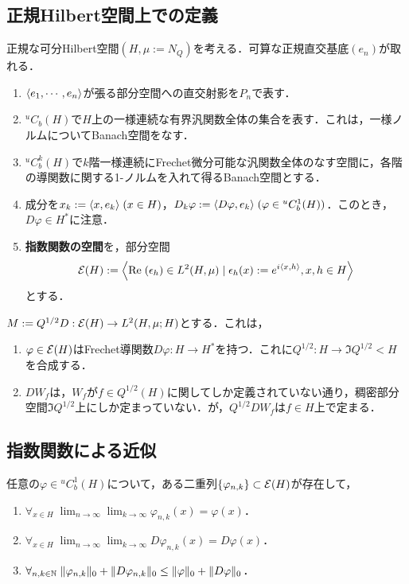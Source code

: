\documentclass[uplatex,dvipdfmx]{jsreport}
\begin{document}
\subsection{正規Hilbert空間上での定義}

\begin{notation}
    正規な可分Hilbert空間$(H,\mu:=N_Q)$を考える．可算な正規直交基底$(e_n)$が取れる．
    \begin{enumerate}
        \item $\langle e_1,\cdots,e_n\rangle$が張る部分空間への直交射影を$P_n$で表す．
        \item ${}^uC_b(H)$で$H$上の一様連続な有界汎関数全体の集合を表す．これは，一様ノルムについてBanach空間をなす．
        \item ${}^uC_b^k(H)$で$k$階一様連続にFrechet微分可能な汎関数全体のなす空間に，各階の導関数に関する1-ノルムを入れて得るBanach空間とする．
        \item 成分を$x_k:=\langle x,e_k\rangle\;(x\in H)$，$D_k\varphi:=\langle D\varphi,e_k\rangle\;(\varphi\in {}^uC_b^1(H))$．このとき，$D\varphi\in H^*$に注意．
        \item \textbf{指数関数の空間}を，部分空間
        \[\mathcal{E}(H):=\left\langle\mathrm{Re}\;(\epsilon_h)\in L^2(H,\mu)\mid \epsilon_h(x):=e^{i\langle x,h\rangle},x,h\in H\right\rangle\]
        とする．
    \end{enumerate}
\end{notation}

\begin{definition}
    $M:=Q^{1/2}D:\mathcal{E}(H)\to L^2(H,\mu;H)$とする．これは，
    \begin{enumerate}
        \item $\varphi\in\mathcal{E}(H)$はFrechet導関数$D\varphi:H\to H^*$を持つ．これに$Q^{1/2}:H\to\Im Q^{1/2}<H$を合成する．
        \item $DW_f$は，$W_f$が$f\in Q^{1/2}(H)$に関してしか定義されていない通り，稠密部分空間$\Im Q^{1/2}$上にしか定まっていない．が，$Q^{1/2}DW_f$は$f\in H$上で定まる．
    \end{enumerate}
\end{definition}

\subsection{指数関数による近似}

\begin{proposition}
    任意の$\varphi\in{}^uC_b^1(H)$について，ある二重列$\{\varphi_{n,k}\}\subset\mathcal{E}(H)$が存在して，
    \begin{enumerate}
        \item $\forall_{x\in H}\;\lim_{n\to\infty}\lim_{k\to\infty}\varphi_{n,k}(x)=\varphi(x)$．
        \item $\forall_{x\in H}\;\lim_{n\to\infty}\lim_{k\to\infty}D\varphi_{n,k}(x)=D\varphi(x)$．
        \item $\forall_{n,k\in\mathbb{N}}\;\|\varphi_{n,k}\|_0+\|D\varphi_{n,k}\|_0\le\|\varphi\|_0+\|D\varphi\|_0$．
    \end{enumerate}
\end{proposition}
\end{document}
